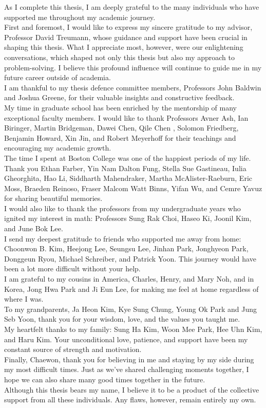 As I complete this thesis, I am deeply grateful to the many individuals who have supported me throughout my academic journey.\\
First and foremost, I would like to express my sincere gratitude to my advisor, Professor David Treumann, whose guidance and support have been crucial in shaping this thesis. What I appreciate most, however, were our enlightening conversations, which shaped not only this thesis but also my approach to problem-solving. I believe this profound influence will continue to guide me in my future career outside of academia.\\
I am thankful to my thesis defence committee members, Professors John Baldwin and Joshua Greene, for their valuable insights and constructive feedback.\\
My time in graduate school has been enriched by the mentorship of many exceptional faculty members. I would like to thank Professors Avner Ash, Ian Biringer, Martin Bridgeman, Dawei Chen, Qile Chen , Solomon Friedberg, Benjamin Howard, Xin Jin, and Robert Meyerhoff for their teachings and encouraging my academic growth.\\
The time I spent at Boston College was one of the happiest periods of my life. Thank you Ethan Farber, Yin Nam Dalton Fung, Stella Sue Gastineau, Iulia Gheorghita, Hao Li, Siddharth Mahendraker, Martha McAlister-Raeburn, Eric Moss, Braeden Reinoso, Fraser Malcom Watt Binns, Yifan Wu, and Cemre Yavuz for sharing beautiful memories.\\
I would also like to thank the professors from my undergraduate years who ignited my interest in math: Professors Sung Rak Choi, Haseo Ki, Joonil Kim, and June Bok Lee.\\
I send my deepest gratitude to friends who supported me away from home: Choonwon B. Kim, Heejong Lee, Seungsu Lee, Jinhan Park, Jonghyeon Park, Donggeun Ryou, Michael Schreiber, and Patrick Yoon. This journey would have been a lot more difficult without your help.\\
I am grateful to my cousins in America, Charles, Henry, and Mary Noh, and in Korea, Jong Hwa Park and Ji Eun Lee, for making me feel at home regardless of where I was.\\
To my grandparents, Ja Heon Kim, Kye Sung Chung, Young Ok Park and Jung Seb Yoon, thank you for your wisdom, love, and the values you taught me.\\
My heartfelt thanks to my family: Sung Ha Kim, Woon Mee Park, Hee Uhn Kim, and Haru Kim. Your unconditional love, patience, and support have been my constant source of strength and motivation.\\
Finally, Chaewon, thank you for believing in me and staying by my side during my most difficult times. Just as we've shared challenging moments together, I hope we can also share many good times together in the future.\\
Although this thesis bears my name, I believe it to be a product of the collective support from all these individuals. Any flaws, however, remain entirely my own.


